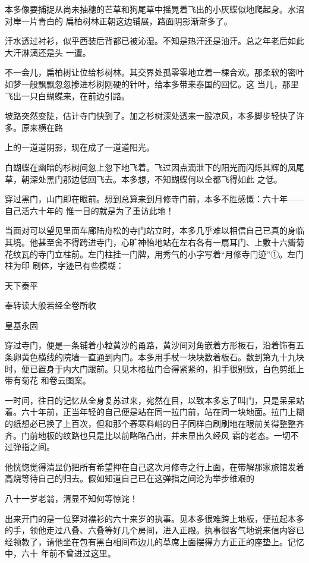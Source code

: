 \documentclass{article}
\begin{document}
本多像要捕捉从尚未抽穗的芒草和狗尾草中摇晃着飞出的小灰蝶似地爬起身。水沼对岸一片青白的
扁柏树林正朝这边铺展，路面阴影渐渐多了。 

汗水透过衬衫，似乎西装后背都已被沁湿。不知是热汗还是油汗。总之年老后如此大汗淋漓还是头
一遭。 

不一会儿，扁柏树让位给杉树林。其交界处孤零零地立着一棵合欢。那柔软的密叶如梦一般飘飘忽忽掺进杉树刚硬的针叶，给本多带来泰国的回忆。这
当儿，那里飞出一只白蝴蝶来，在前边引路。 

坡路突然变陡，估计寺门快到了。加之杉树深处透来一股凉风，本多脚步轻快了许多。原来横在路

\newpage
上的一道道阴影，现在成了一道道阳光。 

白蝴蝶在幽暗的杉树间忽上忽下地飞着。飞过因点滴泄下的阳光而闪烁其辉的凤尾草，朝深处黑门那边低回飞去。本多想，不知蝴蝶何以全都飞得如此
之低。 

穿过黑门，山门即在眼前。想到总算来到月修寺门前，本多不胜感慨：六十年——自己活六十年的
惟一目的就是为了重访此地！ 

当面对可以望见里面车廊陆舟松的寺门站立时，本多几乎难以相信自己已真的身临其境。他甚至舍不得跨进寺门，心旷神怡地站在左右各有一扇耳门、上敷十六瓣菊花纹瓦的寺门立柱前。左门柱挂一门牌，用秀气的小字写着“月修寺门迹”①。左门柱为印
刷体，字迹已有些模糊： 


天下泰平 


奉转读大般若经全卷所收 

\newpage


皇基永固 

穿过寺门，便是一条铺着小粒黄沙的甬路，黄沙间对角嵌着方形板石，沿着饰有五条卵黄色横线的院墙一直通到内门。本多用手杖一块块数着板石。数到第九十九块时，便已置身于内大门跟前。只见木格拉门合得紧紧的，扣手很别致，白色剪纸上带有菊花
和卷云图案。 

一时间，往日的记忆从全身复苏过来，宛然在目，以致本多忘了叫门，只是呆呆站着。六十年前，正当年轻的自己便是站在同一拉门前，站在同一块地面。拉门上糊的纸想必已换了上百次，但和那个春寒料峭的日子同样白刷刷地在眼前关得整整齐齐。门前地板的纹路也只是比以前略略凸出，并未显出久经风
霜的老态。一切不过弹指之间。 

他恍惚觉得清显仍把所有希望押在自己这次月修寺之行上面，在带解那家旅馆发着高烧等待自己的归去。假如知道自己已在这弹指之间沦为举步维艰的

\newpage
八十一岁老翁，清显不知何等惊诧！ 

出来开门的是一位穿对襟衫的六十来岁的执事。见本多很难跨上地板，便拉起本多的手，领他走过八叠、六叠等好几个房间，进入正殿。执事很客气地说来信内容已经领教了，请他坐在包有黑白相间布边儿的草席上面摆得方方正正的座垫上。记忆中，六十
年前不曾进过这里。 
\end{document}
